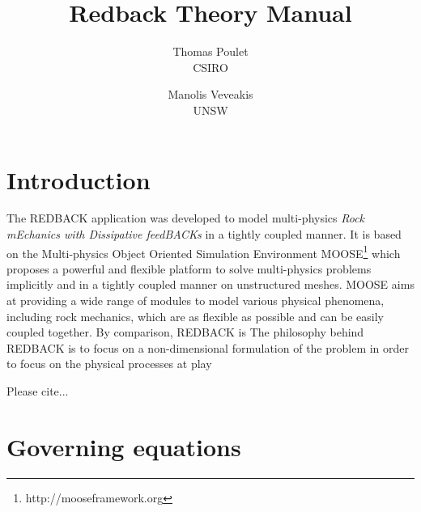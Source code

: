 \documentclass[]{scrreprt}
\newcommand{\moose}{{MOOSE}}
\newcommand{\redback}{{REDBACK}}
\begin{document}
\title{Redback Theory Manual}
\author{Thomas Poulet \\ CSIRO 
	\and Manolis Veveakis \\ UNSW}
\maketitle

\tableofcontents

\chapter{Introduction}

The \redback{} application was developed to model multi-physics \textit{Rock mEchanics with
Dissipative feedBACKs} in a tightly coupled manner. It is based on the Multi-physics Object Oriented Simulation Environment \moose{}\footnote{http://mooseframework.org} \citep{Gaston2009} which proposes a powerful and flexible platform to solve multi-physics problems implicitly and in a tightly coupled manner on unstructured meshes. \moose{} aims at providing a wide range of modules to model various physical phenomena, including rock mechanics, which are as flexible as possible and can be easily coupled together. By comparison, \redback{} is  
The philosophy behind \redback{} is to focus on a non-dimensional formulation of the problem in order to focus on the physical processes at play

Please cite...


\chapter{Governing equations}
\label{chapter:gov_eqs}
\end{document}
